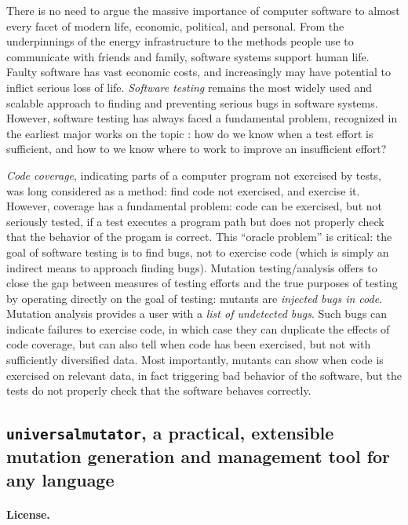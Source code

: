 \documentclass[numbers]{proposalnsf}
\newcommand{\um}{\texttt{universalmutator}}
\begin{document}
There is no need to argue the massive importance of computer software to almost every facet of modern life, economic, political, and personal.  From the underpinnings of the energy infrastructure to the methods people use to communicate with friends and family, software systems support human life.  Faulty software has vast economic costs, and increasingly may have potential to inflict serious loss of life.  \emph{Software testing} remains the most widely used and scalable approach to finding and preventing serious bugs in software systems.  However, software testing has always faced a fundamental problem, recognized in the earliest major works on the topic \cite{Beizer}: how do we know when a test effort is sufficient, and how to we know where to work to improve an insufficient effort?

\emph{Code coverage}, indicating parts of a computer program not exercised by tests, was long considered as a method:  find code not exercised, and exercise it.  However, coverage has a fundamental problem: code can be exercised, but not seriously tested, if a test executes a program path but does not properly check that the behavior of the progam is correct.  This ``oracle problem'' is critical: the goal of software testing is to find bugs, not to exercise code (which is simply an indirect means to approach finding bugs).  Mutation testing/analysis offers to close the gap between measures of testing efforts and the true purposes of testing by operating directly on the goal of testing: mutants are \emph{injected bugs in code}.  Mutation analysis provides a user with a \emph{list of undetected bugs}.  Such bugs can indicate failures to exercise code, in which case they can duplicate the effects of code coverage, but can also tell when code has been exercised, but not with sufficiently diversified data.  Most importantly, mutants can show when code is exercised on relevant data, in fact triggering bad behavior of the software, but the tests do not properly check that the software behaves correctly.

\subsection{\um,  a practical, extensible mutation generation and management tool for any language}

\paragraph{License.}
\end{document}
